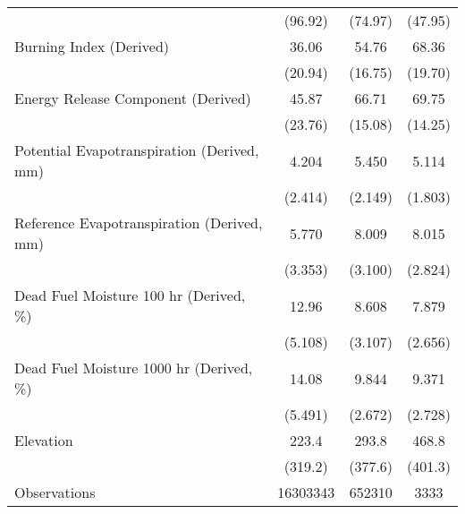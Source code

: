 \begin{tabular}{l*{3}{c}}
                                             &     (96.92)&     (74.97)&     (47.95)\\
[1em]
Burning Index (Derived)                      &       36.06&       54.76&       68.36\\
                                             &     (20.94)&     (16.75)&     (19.70)\\
[1em]
Energy Release Component (Derived)           &       45.87&       66.71&       69.75\\
                                             &     (23.76)&     (15.08)&     (14.25)\\
[1em]
Potential Evapotranspiration (Derived, mm)   &       4.204&       5.450&       5.114\\
                                             &     (2.414)&     (2.149)&     (1.803)\\
[1em]
Reference Evapotranspiration (Derived, mm)   &       5.770&       8.009&       8.015\\
                                             &     (3.353)&     (3.100)&     (2.824)\\
[1em]
Dead Fuel Moisture 100 hr (Derived, \%)      &       12.96&       8.608&       7.879\\
                                             &     (5.108)&     (3.107)&     (2.656)\\
[1em]
Dead Fuel Moisture 1000 hr (Derived, \%)     &       14.08&       9.844&       9.371\\
                                             &     (5.491)&     (2.672)&     (2.728)\\
[1em]
Elevation                                    &       223.4&       293.8&       468.8\\
                                             &     (319.2)&     (377.6)&     (401.3)\\
\hline
Observations                                 &    16303343&      652310&        3333\\
\hline\hline
\end{tabular}
